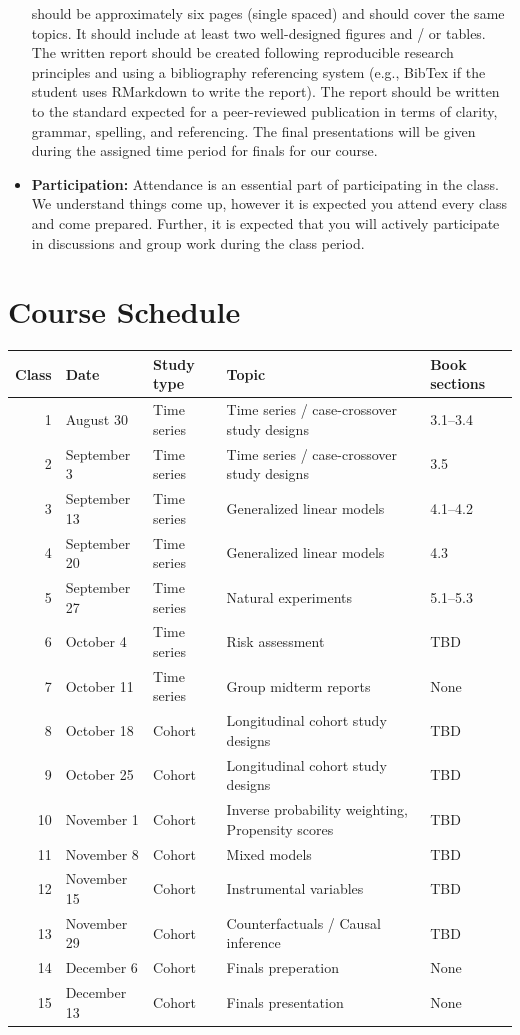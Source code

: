 \documentclass[
]{book}
\begin{document}
\begin{itemize}
  should be approximately six pages (single spaced) and should cover the
  same topics. It should include at least two well-designed figures and / or
  tables. The written report should be created following reproducible
  research principles and using a bibliography referencing system (e.g.,
  BibTex if the student uses RMarkdown to write the report). The report
  should be written to the standard expected for a peer-reviewed
  publication in terms of clarity, grammar, spelling, and referencing.
  The final presentations will be given during the assigned time period
  for finals for our course.
\item
  \textbf{Participation:} Attendance is an essential part of participating
  in the class. We understand things come up, however it is expected you
  attend every class and come prepared. Further, it is expected that you will
  actively participate in discussions and group work during the class period.
\end{itemize}

\hypertarget{course-schedule}{%
\section{Course Schedule}\label{course-schedule}}

\begin{tabular}{r|l|l|l|l}
\hline
Class & Date & Study type & Topic & Book sections\\
\hline
1 & August 30 & Time series & Time series / case-crossover study designs & 3.1--3.4\\
\hline
2 & September 3 & Time series & Time series / case-crossover study designs & 3.5\\
\hline
3 & September 13 & Time series & Generalized linear models & 4.1--4.2\\
\hline
4 & September 20 & Time series & Generalized linear models & 4.3\\
\hline
5 & September 27 & Time series & Natural experiments & 5.1--5.3\\
\hline
6 & October 4 & Time series & Risk assessment & TBD\\
\hline
7 & October 11 & Time series & Group midterm reports & None\\
\hline
8 & October 18 & Cohort & Longitudinal cohort study designs & TBD\\
\hline
9 & October 25 & Cohort & Longitudinal cohort study designs & TBD\\
\hline
10 & November 1 & Cohort & Inverse probability weighting, Propensity scores & TBD\\
\hline
11 & November 8 & Cohort & Mixed models & TBD\\
\hline
12 & November 15 & Cohort & Instrumental variables & TBD\\
\hline
13 & November 29 & Cohort & Counterfactuals / Causal inference & TBD\\
\hline
14 & December 6 & Cohort & Finals preperation & None\\
\hline
15 & December 13 & Cohort & Finals presentation & None\\
\hline
\end{tabular}
\end{document}
